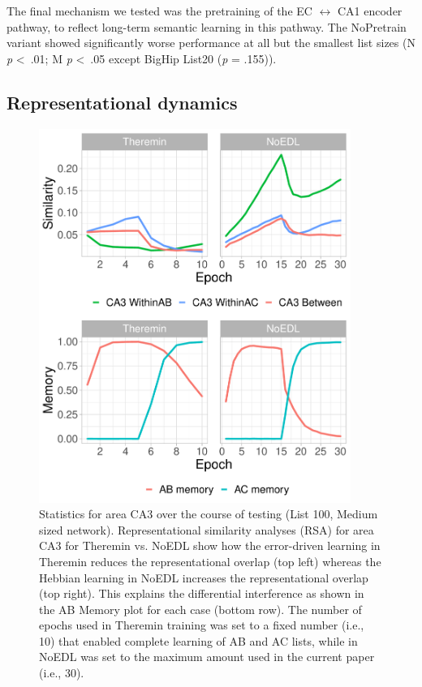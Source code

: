 \documentclass[11pt,twoside]{article}
\newif\myifpdf
\begin{document}
The final mechanism we tested was the pretraining of the EC $\leftrightarrow$ CA1 encoder pathway, to reflect long-term semantic learning in this pathway.  The NoPretrain variant showed significantly worse performance at all but the smallest list sizes (N \emph{p} \textless \ .01; M \emph{p} \textless \ .05 except BigHip List20 (\emph{p} = .155)). 

\subsection{Representational dynamics}

\begin{figure}
  \centering\includegraphics[width=4in]{fig_hip_edl_test_stats}
  \caption{\footnotesize Statistics for area CA3 over the course of testing (List 100, Medium sized network). Representational similarity analyses (RSA) for area CA3 for Theremin vs. NoEDL show how the error-driven learning in Theremin reduces the representational overlap (top left) whereas the Hebbian learning in NoEDL increases the representational overlap (top right).  This explains the differential interference as shown in the AB Memory plot for each case (bottom row). The number of epochs used in Theremin training was set to a fixed number (i.e., 10) that enabled complete learning of AB and AC lists, while in NoEDL was set to the maximum amount used in the current paper (i.e., 30).}
\label{fig.test_stats}
\end{figure}
\end{document}
